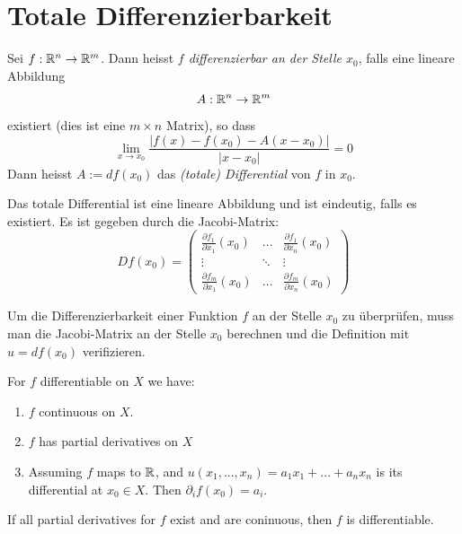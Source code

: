 \section{Totale Differenzierbarkeit}

\begin{definition}
    Sei $f: \mathbb{R}^n \to \mathbb{R}^m$. Dann heisst \textit{$f$ differenzierbar an der Stelle $x_0$}, falls eine lineare Abbildung 
    $$ A: \mathbb{R}^n \to \mathbb{R}^m$$ existiert (dies ist eine $m \times n$ Matrix), so dass
    $$ \lim_{x \to x_0} \frac{|f(x) -f(x_0) - A(x-x_0)|}{|x-x_0|} = 0$$
    Dann heisst $A:= df(x_0)$ das \textit{(totale) Differential} von $f$ in $x_0$.
\end{definition}

\begin{definition}
    Das totale Differential ist eine lineare Abbildung und ist eindeutig, falls es existiert. Es ist gegeben durch die Jacobi-Matrix:
    $$ Df(x_0) = \begin{pmatrix}
    \frac{\partial f_1}{\partial x_1}(x_0)  & \dots     & \frac{\partial f_1}{\partial x_n}(x_0) \\ 
    \vdots                                  & \ddots    & \vdots \\ 
    \frac{\partial f_m}{\partial x_1}(x_0)  & \dots     & \frac{\partial f_m}{\partial x_n}(x_0)
    \end{pmatrix} $$
\end{definition}

\begin{remark}
    Um die Differenzierbarkeit einer Funktion $f$ an der Stelle $x_0$ zu überprüfen, muss man die Jacobi-Matrix an der Stelle $x_0$ berechnen und die Definition mit $u = df(x_0)$ verifizieren.
\end{remark}

\begin{theorem}
	For $f$ differentiable on $X$ we have:
	\begin{enumerate}
		\item $f$ continuous on $X$.
		\item $f$ has partial derivatives on $X$
		\item Assuming $f$ maps to $\mathbb{R}$, and $u(x_1,...,x_n) = a_1x_1 + ... + a_nx_n$ is its differential at $x_0 \in X$.
			Then $\partial_if(x_0) = a_i$.
	\end{enumerate}
\end{theorem}

\begin{theorem}
	If all partial derivatives for $f$ exist and are coninuous, then $f$ is differentiable.
\end{theorem}

